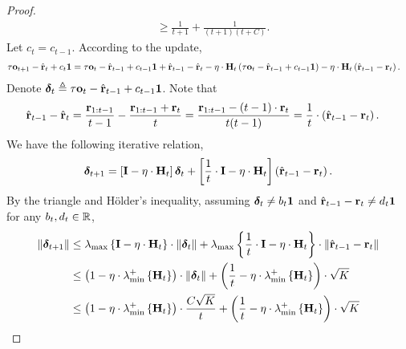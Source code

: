 \begin{proof}
\begin{equation*}
\begin{split}
    &\ge \frac{1}{t+1} + \frac{1}{(t+1)(t+C)}.
\end{split}
\end{equation*}
Let $c_{t} = c_{t-1}$. According to the update,
\begin{equation*}
\begin{split}
    \tau {\mathbf{o}}_{t+1} - \hat{{\mathbf{r}}}_t + c_{t} {\mathbf{1}} &= \tau {\mathbf{o}}_{t} - \hat{{\mathbf{r}}}_{t-1} + c_{t-1} {\mathbf{1}} + \hat{{\mathbf{r}}}_{t-1} - \hat{{\mathbf{r}}}_t - \eta \cdot {\mathbf{H}}_t \left( \tau {\mathbf{o}}_{t} - \hat{{\mathbf{r}}}_{t-1} + c_{t-1} {\mathbf{1}} \right) - \eta \cdot {\mathbf{H}}_t \left( \hat{{\mathbf{r}}}_{t-1} - {\mathbf{r}}_t \right).
\end{split}
\end{equation*}
Denote ${\boldsymbol{\delta}}_{t} \triangleq \tau {\mathbf{o}}_{t} - \hat{{\mathbf{r}}}_{t-1} + c_{t-1} {\mathbf{1}}$. Note that
\begin{equation*}
\begin{split}
    \hat{{\mathbf{r}}}_{t-1} - \hat{{\mathbf{r}}}_t &= \frac{{\mathbf{r}}_{1:t-1}}{t-1} - \frac{{\mathbf{r}}_{1:t-1} + {\mathbf{r}}_t}{t} = \frac{{\mathbf{r}}_{1:t-1} - (t-1) \cdot {\mathbf{r}}_t }{t(t-1)} = \frac{1}{t} \cdot \left( \hat{{\mathbf{r}}}_{t-1} - {\mathbf{r}}_t \right).
\end{split}
\end{equation*}
We have the following iterative relation,
\begin{equation*}
\begin{split}
    {\boldsymbol{\delta}}_{t+1} = \left[ {\mathbf{I}} - \eta \cdot {\mathbf{H}}_t \right] {\boldsymbol{\delta}}_t + \left[ \frac{1}{t} \cdot {\mathbf{I}} - \eta \cdot {\mathbf{H}}_t \right] \left( \hat{{\mathbf{r}}}_{t-1} - {\mathbf{r}}_t \right).
\end{split}
\end{equation*}
By the triangle and H{\" o}lder's inequality, assuming ${\boldsymbol{\delta}}_t \not= b_t {\mathbf{1}}$ and $\hat{{\mathbf{r}}}_{t-1} - {\mathbf{r}}_t \not= d_t {\mathbf{1}}$ for any $b_t, d_t \in {\mathbb{R}}$,
\begin{equation*}
\begin{split}
    \left\| \rvdelta_{t+1} \right\| &\le \lambda_{\max}\left\{ \rmI - \eta \cdot \rmH_t \right\} \cdot \left\| \rvdelta_{t} \right\| + \lambda_{\max}\left\{ \frac{1}{t} \cdot \rmI - \eta \cdot \rmH_t \right\} \cdot \left\| \hat{\rvr}_{t-1} - \rvr_t \right\| \\
    &\le \left( 1 - \eta \cdot \lambda_{\min}^{+}\left\{ \rmH_t \right\} \right) \cdot \left\| \rvdelta_{t} \right\| + \left( \frac{1}{t} - \eta \cdot \lambda_{\min}^{+}\left\{ \rmH_t \right\} \right) \cdot \sqrt{K} \\
    &\le \left( 1 - \eta \cdot \lambda_{\min}^{+}\left\{ \rmH_t \right\} \right) \cdot \frac{C \sqrt{K}}{t} + \left( \frac{1}{t} - \eta \cdot \lambda_{\min}^{+}\left\{ \rmH_t \right\} \right) \cdot \sqrt{K} \\

\end{split}
\end{equation*}
\end{proof}
